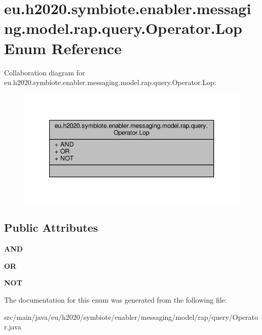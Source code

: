 \hypertarget{enumeu_1_1h2020_1_1symbiote_1_1enabler_1_1messaging_1_1model_1_1rap_1_1query_1_1Operator_1_1Lop}{}\section{eu.\+h2020.\+symbiote.\+enabler.\+messaging.\+model.\+rap.\+query.\+Operator.\+Lop Enum Reference}
\label{enumeu_1_1h2020_1_1symbiote_1_1enabler_1_1messaging_1_1model_1_1rap_1_1query_1_1Operator_1_1Lop}


Collaboration diagram for eu.\+h2020.\+symbiote.\+enabler.\+messaging.\+model.\+rap.\+query.\+Operator.\+Lop\+:
\nopagebreak
\begin{figure}[H]
\begin{center}
\leavevmode
\includegraphics[width=340pt]{enumeu_1_1h2020_1_1symbiote_1_1enabler_1_1messaging_1_1model_1_1rap_1_1query_1_1Operator_1_1Lop__coll__graph}
\end{center}
\end{figure}
\subsection*{Public Attributes}
\begin{DoxyCompactItemize}
\item 
\mbox{\label{enumeu_1_1h2020_1_1symbiote_1_1enabler_1_1messaging_1_1model_1_1rap_1_1query_1_1Operator_1_1Lop_a42399f912d84073463a10172b68cd78f}} 
{\bfseries A\+ND}
\item 
\mbox{\label{enumeu_1_1h2020_1_1symbiote_1_1enabler_1_1messaging_1_1model_1_1rap_1_1query_1_1Operator_1_1Lop_ad6c97aa2fe0591cb4ca60504d30fbeb4}} 
{\bfseries OR}
\item 
\mbox{\label{enumeu_1_1h2020_1_1symbiote_1_1enabler_1_1messaging_1_1model_1_1rap_1_1query_1_1Operator_1_1Lop_ad083e77fd0f1af7323f3dffa386b1fdc}} 
{\bfseries N\+OT}
\end{DoxyCompactItemize}


The documentation for this enum was generated from the following file\+:\begin{DoxyCompactItemize}
\item 
src/main/java/eu/h2020/symbiote/enabler/messaging/model/rap/query/Operator.\+java\end{DoxyCompactItemize}
